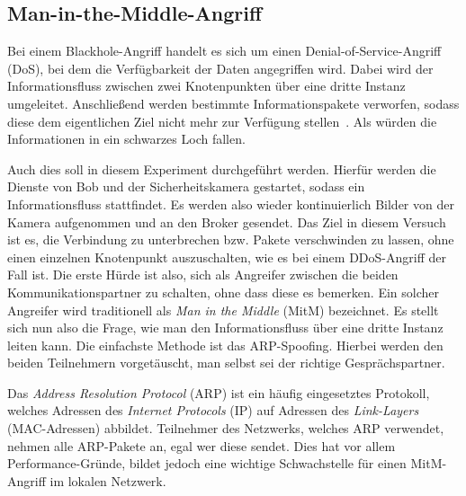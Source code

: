 \subsection{Man-in-the-Middle-Angriff}
Bei einem Blackhole-Angriff handelt es sich um einen Denial-of-Service-Angriff
(DoS), bei dem die Verfügbarkeit der Daten angegriffen wird. Dabei wird der
Informationsfluss zwischen zwei Knotenpunkten über eine dritte Instanz
umgeleitet. Anschließend werden bestimmte Informationspakete verworfen, sodass
diese dem eigentlichen Ziel nicht mehr zur Verfügung stellen~\cite{aad2004}. Als
würden die Informationen in ein schwarzes Loch fallen.

Auch dies soll in diesem Experiment durchgeführt werden. Hierfür werden die
Dienste von Bob und der Sicherheitskamera gestartet, sodass ein
Informationsfluss stattfindet. Es werden also wieder kontinuierlich Bilder von
der Kamera aufgenommen und an den Broker gesendet. Das Ziel in diesem Versuch
ist es, die Verbindung zu unterbrechen bzw. Pakete verschwinden zu lassen, ohne
einen einzelnen Knotenpunkt auszuschalten, wie es bei einem DDoS-Angriff der
Fall ist. Die erste Hürde ist also, sich als Angreifer zwischen die beiden
Kommunikationspartner zu schalten, ohne dass diese es bemerken. Ein solcher
Angreifer wird traditionell als \textit{Man in the Middle} (MitM) bezeichnet. Es
stellt sich nun also die Frage, wie man den Informationsfluss über eine dritte
Instanz leiten kann. Die einfachste Methode ist das ARP-Spoofing. Hierbei werden
den beiden Teilnehmern vorgetäuscht, man selbst sei der richtige
Gesprächspartner.

Das \textit{Address Resolution Protocol} (ARP) ist ein häufig eingesetztes
Protokoll, welches Adressen des \textit{Internet Protocols} (IP) auf Adressen
des \textit{Link-Layers} (MAC-Adressen) abbildet. Teilnehmer des Netzwerks,
welches ARP verwendet, nehmen alle ARP-Pakete an, egal wer diese sendet. Dies
hat vor allem Performance-Gründe, bildet jedoch eine wichtige Schwachstelle für
einen MitM-Angriff im lokalen Netzwerk.

